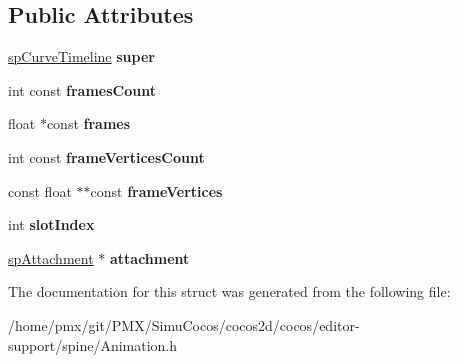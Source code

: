 \subsection*{Public Attributes}
\begin{DoxyCompactItemize}
\item 
\mbox{\label{structspDeformTimeline_ae596b12a7c14071822ae49a3d70417f8}} 
\hyperlink{structspCurveTimeline}{sp\+Curve\+Timeline} {\bfseries super}
\item 
\mbox{\label{structspDeformTimeline_af2da3d861b9dfc100076630aa2478a98}} 
int const {\bfseries frames\+Count}
\item 
\mbox{\label{structspDeformTimeline_adaebf95d853583506deac59db0190e78}} 
float $\ast$const {\bfseries frames}
\item 
\mbox{\label{structspDeformTimeline_a44a6438785f2b89668d6398ec6bb0d52}} 
int const {\bfseries frame\+Vertices\+Count}
\item 
\mbox{\label{structspDeformTimeline_af7b85c59068beae2c7ae3561d420c1f5}} 
const float $\ast$$\ast$const {\bfseries frame\+Vertices}
\item 
\mbox{\label{structspDeformTimeline_a98a5cd81599b347e1585231a08fba26e}} 
int {\bfseries slot\+Index}
\item 
\mbox{\label{structspDeformTimeline_a1657a370c38649f9dc674979756650d1}} 
\hyperlink{structspAttachment}{sp\+Attachment} $\ast$ {\bfseries attachment}
\end{DoxyCompactItemize}


The documentation for this struct was generated from the following file\+:\begin{DoxyCompactItemize}
\item 
/home/pmx/git/\+P\+M\+X/\+Simu\+Cocos/cocos2d/cocos/editor-\/support/spine/Animation.\+h\end{DoxyCompactItemize}
